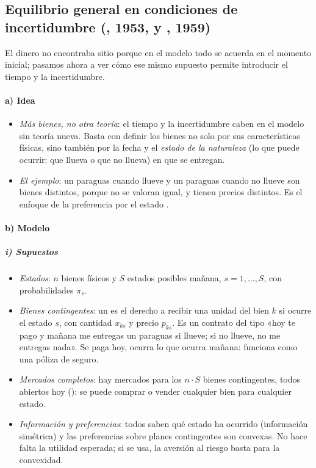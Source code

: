 \documentclass[11pt]{article}
\begin{document}
\subsection{Equilibrio general en condiciones de incertidumbre (, 1953, y , 1959)}\label{sec:equilibrio-general-condiciones}

El dinero no encontraba sitio porque en el modelo todo se acuerda en el momento inicial; pasamos ahora a ver cómo ese mismo supuesto permite introducir el tiempo y la incertidumbre.

\paragraph{a) Idea}

\begin{itemize}
\item \emph{Más bienes, no otra teoría}: el tiempo y la incertidumbre caben en el modelo sin teoría nueva. Basta con definir los bienes no solo por sus características físicas, sino también por la fecha y el \emph{estado de la naturaleza} (lo que puede ocurrir: que llueva o que no llueva) en que se entregan\nocite{Debreu1959Theory}.
\item \emph{El ejemplo}: un paraguas cuando llueve y un paraguas cuando no llueve son bienes distintos, porque no se valoran igual, y tienen precios distintos. Es el enfoque de la preferencia por el estado .
\end{itemize}

\paragraph{b) Modelo}

\subparagraph{i) Supuestos}

\begin{itemize}
\item \emph{Estados}: $n$ bienes físicos y $S$ estados posibles mañana, $s=1,\dots,S$, con probabilidades $\pi_s$.
\item \emph{Bienes contingentes}: un  es el derecho a recibir una unidad del bien $k$ si ocurre el estado $s$, con cantidad $x_{ks}$ y precio $p_{ks}$. Es un contrato del tipo «hoy te pago y mañana me entregas un paraguas si llueve; si no llueve, no me entregas nada». Se paga hoy, ocurra lo que ocurra mañana: funciona como una póliza de seguro.
\item \emph{Mercados completos}: hay mercados para los $n\cdot S$ bienes contingentes, todos abiertos hoy (): se puede comprar o vender cualquier bien para cualquier estado.
\item \emph{Información y preferencias}: todos saben qué estado ha ocurrido (información simétrica) y las preferencias sobre planes contingentes son convexas. No hace falta la utilidad esperada; si se usa, la aversión al riesgo basta para la convexidad.
\end{itemize}
\end{document}
